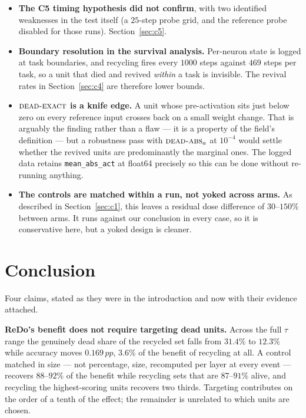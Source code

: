 \documentclass[10pt]{article}
\newcommand{\dexact}{\textsc{dead-exact}}
\newcommand{\dabs}{\textsc{dead-abs}_a}
\newcommand{\pp}{\,pp}
\begin{document}
\begin{itemize}
\item \textbf{The C5 timing hypothesis did not confirm}, with two identified
weaknesses in the test itself (a $25$-step probe grid, and the reference probe
disabled for those runs). Section~\ref{sec:c5}.

\item \textbf{Boundary resolution in the survival analysis.} Per-neuron state is
logged at task boundaries, and recycling fires every $1000$ steps against $469$
steps per task, so a unit that died and revived \emph{within} a task is
invisible. The revival rates in Section~\ref{sec:c4} are therefore lower bounds.

\item \textbf{$\dexact$ is a knife edge.} A unit whose pre-activation sits just
below zero on every reference input crosses back on a small weight change. That
is arguably the finding rather than a flaw --- it is a property of the field's
definition --- but a robustness pass with $\dabs$ at $10^{-4}$ would settle
whether the revived units are predominantly the marginal ones. The logged data
retains \texttt{mean\_abs\_act} at float64 precisely so this can be done without
re-running anything.

\item \textbf{The controls are matched within a run, not yoked across arms.} As
described in Section~\ref{sec:c1}, this leaves a residual dose difference of
$30$--$150\%$ between arms. It runs against our conclusion in every case, so it
is conservative here, but a yoked design is cleaner.
\end{itemize}

\section{Conclusion}

Four claims, stated as they were in the introduction and now with their
evidence attached.

\textbf{ReDo's benefit does not require targeting dead units.} Across the full
$\tau$ range the genuinely dead share of the recycled set falls from $31.4\%$ to
$12.3\%$ while accuracy moves $0.169\pp$, $3.6\%$ of the benefit of recycling at
all. A control matched in size --- not percentage, size, recomputed per layer at
every event --- recovers $88$--$92\%$ of the benefit while recycling sets that
are $87$--$91\%$ alive, and recycling the highest-scoring units recovers two
thirds. Targeting contributes on the order of a tenth of the effect; the
remainder is unrelated to which units are chosen.
\end{document}

